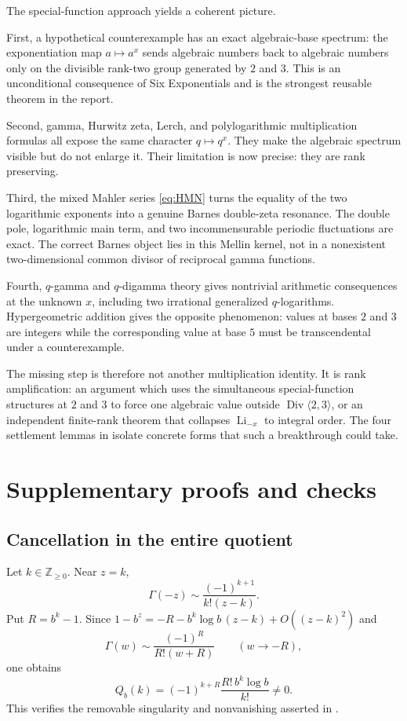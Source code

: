 \documentclass[11pt]{article}
\numberwithin{equation}{section}
\theoremstyle{definition}
\theoremstyle{remark}
\newcommand{\Z}{\mathbb{Z}}
\newcommand{\Li}{\operatorname{Li}}
\newcommand{\Div}{\operatorname{Div}}
\begin{document}
The special-function approach yields a coherent picture.

First, a hypothetical counterexample has an exact algebraic-base spectrum: the exponentiation map $a\mapsto a^x$ sends algebraic numbers back to algebraic numbers only on the divisible rank-two group generated by $2$ and $3$.  This is an unconditional consequence of Six Exponentials and is the strongest reusable theorem in the report.

Second, gamma, Hurwitz zeta, Lerch, and polylogarithmic multiplication formulas all expose the same character $q\mapsto q^x$.  They make the algebraic spectrum visible but do not enlarge it.  Their limitation is now precise: they are rank preserving.

Third, the mixed Mahler series \eqref{eq:HMN} turns the equality of the two logarithmic exponents into a genuine Barnes double-zeta resonance.  The double pole, logarithmic main term, and two incommensurable periodic fluctuations are exact.  The correct Barnes object lies in this Mellin kernel, not in a nonexistent two-dimensional common divisor of reciprocal gamma functions.

Fourth, $q$-gamma and $q$-digamma theory gives nontrivial arithmetic consequences at the unknown $x$, including two irrational generalized $q$-logarithms.  Hypergeometric addition gives the opposite phenomenon: values at bases $2$ and $3$ are integers while the corresponding value at base $5$ must be transcendental under a counterexample.

The missing step is therefore not another multiplication identity.  It is rank amplification: an argument which uses the simultaneous special-function structures at $2$ and $3$ to force one algebraic value outside $\Div\langle2,3\rangle$, or an independent finite-rank theorem that collapses $\Li_{-x}$ to integral order.  The four settlement lemmas in  isolate concrete forms that such a breakthrough could take.

\appendix
\section{Supplementary proofs and checks}
\label{app:proofs}

\subsection{Cancellation in the entire quotient}
Let $k\in\Z_{\ge0}$.  Near $z=k$,
\[
 \Gamma(-z)\sim\frac{(-1)^{k+1}}{k!(z-k)}.
\]
Put $R=b^k-1$.  Since $1-b^z=-R-b^k\log b\,(z-k)+O((z-k)^2)$ and
\[
 \Gamma(w)\sim\frac{(-1)^R}{R!(w+R)}\qquad(w\to-R),
\]
one obtains
\[
 Q_b(k)=(-1)^{k+R}\frac{R!\,b^k\log b}{k!}\ne0.
\]
This verifies the removable singularity and nonvanishing asserted in .
\end{document}

